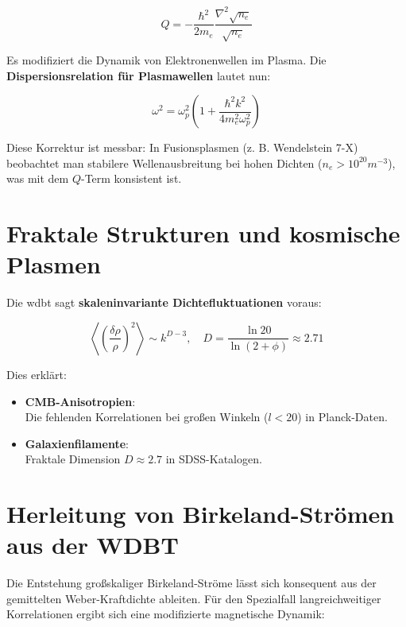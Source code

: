 \begin{equation}
    \label{eq:quantenpotential}
    Q = -\frac{\hbar^2}{2m_e} \frac{\nabla^2 \sqrt{n_e}}{\sqrt{n_e}}
\end{equation}

Es modifiziert die Dynamik von Elektronenwellen im Plasma. Die \textbf{Dispersionsrelation für Plasmawellen} lautet nun:

\begin{equation}
    \label{eq:dispersionrelation}
    \omega^2 = \omega_p^2 \left( 1 + \frac{\hbar^2 k^2}{4 m_e^2 \omega_p^2} \right)
\end{equation}

Diese Korrektur ist messbar: In Fusionsplasmen (z. B. Wendelstein 7-X) beobachtet man stabilere Wellenausbreitung bei hohen Dichten ($n_e > 10^{20} m^{-3}$), was mit dem $Q$-Term
konsistent ist.

\section{Fraktale Strukturen und kosmische Plasmen}
Die \gls{wdbt} sagt \textbf{skaleninvariante Dichtefluktuationen} voraus:

\begin{equation}
    \label{eq:dichtefluktuation}
    \left\langle \left( \frac{\delta \rho}{\rho} \right)^2 \right\rangle \sim k^{D-3}, \quad D = \frac{\ln 20}{\ln(2+\phi)} \approx 2.71
\end{equation}

Dies erklärt:

\begin{itemize}
    \item \textbf{CMB-Anisotropien}:\\Die fehlenden Korrelationen bei großen Winkeln ($l < 20$) in Planck-Daten.
    \item \textbf{Galaxienfilamente}:\\Fraktale Dimension $D \approx 2.7$ in SDSS-Katalogen.
\end{itemize}

\section{Herleitung von Birkeland-Strömen aus der WDBT}
Die Entstehung großskaliger Birkeland-Ströme lässt sich konsequent aus der gemittelten Weber-Kraftdichte ableiten. Für den Spezialfall langreichweitiger Korrelationen ergibt sich eine modifizierte
magnetische Dynamik:

